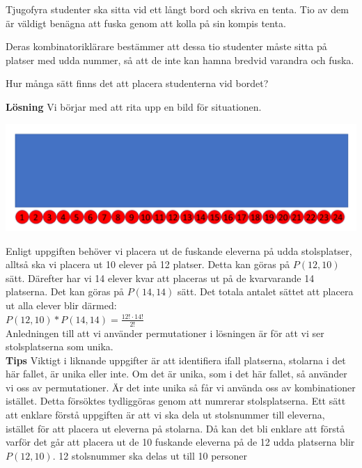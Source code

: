 \documentclass{tufte-handout}
\begin{document}
\begin{xca}
	Tjugofyra studenter ska sitta vid ett långt bord och skriva en tenta. Tio av dem är väldigt benägna att fuska genom att kolla på sin kompis tenta.

	Deras kombinatoriklärare bestämmer att dessa tio studenter måste sitta på platser med udda nummer, så att de inte kan hamna bredvid varandra och fuska.

	Hur många sätt finns det att placera studenterna vid bordet?

    \noindent\textbf{Lösning} 
    Vi börjar med att rita upp en bild för situationen.
\begin{center}
    \includegraphics{bordmedstolar.png}
\end{center}
    Enligt uppgiften behöver vi placera ut de fuskande eleverna på udda stolsplatser, alltså ska vi placera ut 10 elever på 12 platser. Detta kan göras på $P(12,10)$ sätt. Därefter har vi 14 elever kvar att placeras ut på de kvarvarande 14 platserna. Det kan göras på $P(14,14)$ sätt. Det totala antalet sättet att placera ut alla elever blir därmed:\\
    $P(12,10)*P(14,14)=\frac{12!\cdot14!}{2!}$\\
    \noindent Anledningen till att vi använder permutationer i lösningen är för att vi ser stolsplatserna som unika.\\
    \noindent\textbf{Tips}
    Viktigt i liknande uppgifter är att identifiera ifall platserna, stolarna i det här fallet, är unika eller inte. Om det är unika, som i det här fallet, så använder vi oss av permutationer. Är det inte unika så får vi använda oss av kombinationer istället. Detta försöktes tydliggöras genom att numrerar stolsplatserna. 
    Ett sätt att enklare förstå uppgiften är att vi ska dela ut stolsnummer till eleverna, istället för att placera ut eleverna på stolarna. Då kan det bli enklare att förstå varför det går att placera ut de 10 fuskande eleverna på de 12 udda platserna blir $P(12,10)$. 12 stolsnummer ska delas ut till 10 personer
\end{xca}
\end{document}
